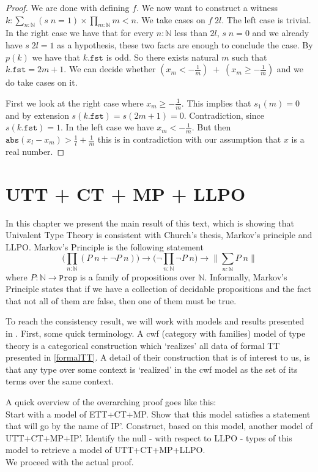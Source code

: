 \documentclass[12pt]{report}
\theoremstyle{definition}
\begin{document}
\begin{proof}
We are done with defining $f$. 
We now want to construct a witness $k : \sum_{n : \mathbb{N}}(s\;n = 1)\times \prod_{m : \mathbb{N}}m < n$. 
We take cases on $f\; 2l$. 
The left case is trivial. 
In the right case we have that for every $n :\mathbb{N}$ less than $2l$, $s\;n = 0$ and we already have $s\;2l = 1$ as a hypothesis, these two facts are enough to conclude the case. 
By $p(k)$ we have that $k.\mathtt{fst}$ is odd. 
So there exists natural $m$ such that $k.\mathtt{fst} = 2m+1$. 
We can decide whether $(x_m < -\frac{1}{m})\;+\;(x_m \geq -\frac{1}{m})$ and we do take cases on it. 

First we look at the right case where $x_m \geq -\frac{1}{m}$. 
This implies that $s_1(m) = 0$ and by extension $s(k.\mathtt{fst}) = s(2m+1) = 0$. 
Contradiction, since $s(k.\mathtt{fst}) = 1$. 
In the left case we have $x_m < -\frac{1}{m}$. 
But then $\mathtt{abs}(x_l-x_m) > \frac{1}{l} + \frac{1}{m}$ this is in contradiction with our assumption that $x$ is a real number. 
\end{proof}

\chapter{UTT + CT + MP + LLPO}
In this chapter we present the main result of this text, which is showing that Univalent Type Theory is consistent with Church's thesis, Markov's principle and LLPO. 
Markov's Principle is the following statement
$$\Big(\prod_{n : \mathbb{N}}(P\; n + \neg P\; n)\Big) \rightarrow  \Big(\neg \prod_{n : \mathbb{N}}\neg P\; n\Big)\rightarrow \Big\lVert \sum_{n : \mathbb{N}} P\; n \Big\rVert$$
where $P : \mathbb{N} \rightarrow \mathtt{Prop}$ is a family of propositions over $\mathbb{N}$. 
Informally, Markov's Principle states that if we have a collection of decidable propositions and the fact that not all of them are false, then one of them must be true.

To reach the consistency result, we will work with models and results presented in \cite{1905.03014}. 
First, some quick terminology. 
A cwf (category with families) model of type theory is a categorical construction which `realizes' all data of formal TT presented in \ref{formalTT}. 
A detail of their construction that is of interest to us, is that any type over some context is `realized' in the cwf model as the set of its terms over the same context. 

A quick overview of the overarching proof goes like this:\\
Start with a model of ETT+CT+MP. 
Show that this model satisfies a statement that will go by the name of IP'. 
Construct, based on this model, another model of UTT+CT+MP+IP'. 
Identify the null - with respect to LLPO - types of this model to retrieve a model of UTT+CT+MP+LLPO.\\
We proceed with the actual proof. 
\end{document}
